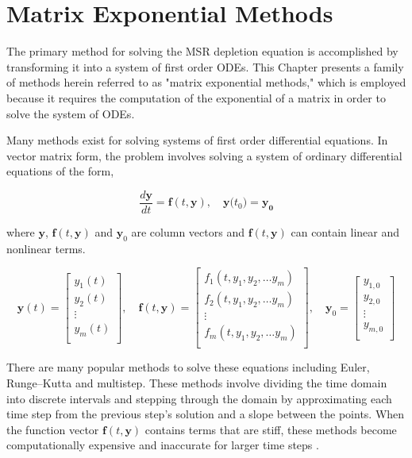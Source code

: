 \chapter{Matrix Exponential Methods}\label{ch:matrixEXPMethods}
The primary method for solving the MSR depletion equation is accomplished by transforming it into a system of first order ODEs. This Chapter presents a family of methods herein referred to as "matrix exponential methods," which is employed because it requires the computation of the exponential of a matrix in order to solve the system of ODEs.

Many methods exist for solving systems of first order differential equations. In vector matrix form, the problem involves solving a system of ordinary differential equations of the form,

\begin{equation}
    \frac{d\boldsymbol{y}}{dt} = \boldsymbol{f}(t,\boldsymbol{y}), \quad \boldsymbol{y}({t_{0})} = \boldsymbol{y_{0}}
    \label{eq:ODE_matrix_form}
\end{equation}{}

\noindent
where $\boldsymbol{y}$, $\boldsymbol{f}(t,\boldsymbol{y})$ and $\boldsymbol{y}_{0}$ are column vectors and $\boldsymbol{f}(t,\boldsymbol{y})$ can contain linear and nonlinear terms. 

$$
\boldsymbol{y}(t) = 
\begin{bmatrix}
y_{1}(t) \\
y_{2}(t) \\
\vdots \\
y_{m}(t) \\
\end{bmatrix}, \quad 
\boldsymbol{f}(t,\boldsymbol{y}) = 
\begin{bmatrix}
f_{1}(t, y_{1}, y_{2}, \dots y_{m}) \\ 
f_{2}(t, y_{1}, y_{2}, \dots y_{m}) \\ 
\vdots \\
f_{m}(t, y_{1}, y_{2}, \dots y_{m}) \\ 
\end{bmatrix}, \quad
\boldsymbol{y}_{0} = 
\begin{bmatrix}
y_{1,0} \\
y_{2,0} \\
\vdots \\ 
y_{m,0} \\
\end{bmatrix}
$$

There are many popular methods to solve these equations including Euler, Runge–Kutta and multistep. These methods involve dividing the time domain into discrete intervals and stepping through the domain by approximating each time step from the previous step's solution and a slope between the points. When the function vector $\boldsymbol{f}(t,\boldsymbol{y})$ contains terms that are stiff, these methods become computationally expensive and inaccurate for larger time steps \cite{ash2009} \cite{ODECh82011}.

